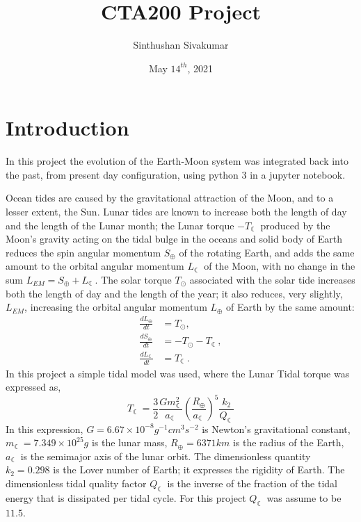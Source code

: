 \documentclass[12pt]{article}
\title{CTA200 Project}
\author{Sinthushan Sivakumar}
\date{May $14^{th}$, 2021}
\begin{document}
\maketitle

\section{Introduction}
In this project the evolution of the Earth-Moon system was integrated back into the past, from present day configuration, using python 3 in a jupyter notebook. 

Ocean tides are caused by the gravitational attraction of the Moon, and to a lesser extent, the Sun. Lunar tides are known to increase both the length of day and the length of the Lunar month; the Lunar torque $-T_{\leftmoon}$ produced by the Moon’s gravity acting on the tidal bulge in the oceans and solid body of Earth reduces the spin angular momentum $S_{\oplus}$ of the rotating Earth, and adds the same amount to the orbital angular momentum $L_{\leftmoon}$ of the Moon, with no change in the sum $L_{EM} = S_{\oplus} + L_{\leftmoon}$. The solar torque $T_{\odot}$ associated with the solar tide increases both the length of day and the length of the year; it also reduces, very slightly, $L_{EM}$, increasing the orbital angular momentum $L_{\oplus}$ of Earth by the same amount:
\begin{align}
    \frac{dL_{\oplus}}{dt} &= T_{\odot}, \\
    \frac{dS_{\oplus}}{dt} &= -T_{\odot} - T_{\leftmoon}, \\
    \frac{dL_{\leftmoon}}{dt} &= T_{\leftmoon}.
\end{align}
In this project a simple tidal model was used, where the Lunar Tidal torque was expressed as,
\begin{equation}
    T_{\leftmoon} = \frac{3}{2} \frac{Gm_{\leftmoon}^{2}}{a_{\leftmoon}} \left(\frac{R_{\oplus}}{a_{\leftmoon}}\right)^{5} \frac{k_{2}}{Q_{\leftmoon}}
\end{equation}
In this expression, $G=6.67 \times 10^{-8} g^{-1}cm^{3}s^{-2}$ is Newton’s gravitational constant, $m_{\leftmoon}=7.349 \times 10^{25} g$ is the lunar mass, $R_{\oplus}=6371 km$ is the radius of the Earth, $a_{\leftmoon}$ is the semimajor axis of the lunar orbit. The dimensionless quantity $k_{2} = 0.298$ is the Lover number of Earth; it expresses the rigidity of Earth. The dimensionless tidal quality factor $Q_{\leftmoon}$ is the inverse of the fraction of the tidal energy that is dissipated per tidal cycle. For this project $Q_{\leftmoon}$ was assume to be $11.5$.
\end{document}
